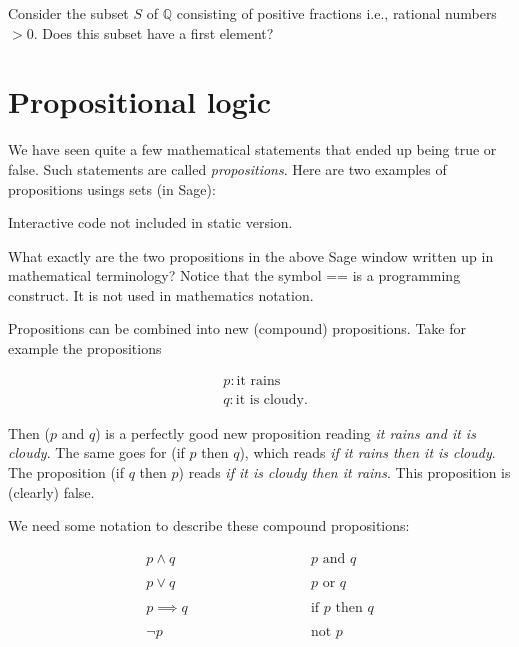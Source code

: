 \begin{exercise}
  Consider the subset $S$ of $\mathbb{Q}$ consisting of positive fractions i.e., rational numbers  $>0$.
  Does this subset have a first element?
\end{exercise}

\section{Propositional logic}

We have seen quite a few mathematical statements that ended up
being true or false. Such statements are called \emph{propositions}.
Here are two examples of propositions usings sets (in Sage):

\begin{sage} Interactive code not included in static version.\end{sage}

\begin{exercise}
  What exactly are the two propositions in the above Sage window written
  up in mathematical terminology? Notice that the symbol == is
  a programming construct. It is not used in mathematics notation.
\end{exercise}

Propositions can be combined into
new (compound) propositions. Take for example the propositions

\begin{align*}
   & p: \text{it rains}      \\
   & q: \text{it is cloudy}.
\end{align*}

Then ($p$ and $q$) is a perfectly good
new proposition reading \emph{it rains and it is cloudy}. The same goes for (if $p$ then $q$), which reads
\emph{if it rains then it is cloudy}. The proposition (if $q$ then $p$) reads \emph{if it is cloudy then
  it rains}. This proposition is (clearly) false.


We need some notation to describe these compound propositions:

\begin{equation*}
  \begin{array}{ll}
    p \land q\qquad\qquad   & \qquad\qquad p \text{ and } q             \\
    \\
    p \lor q\qquad\qquad    & \qquad\qquad p \text{ or } q              \\
    \\
    p\implies q\qquad\qquad & \qquad\qquad \text{if } p \text{ then } q \\
    \\
    \neg p\qquad\qquad      & \qquad\qquad \text{not } p
  \end{array}
\end{equation*}

